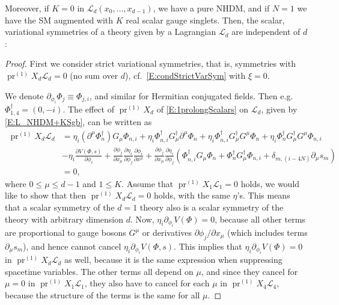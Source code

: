 \documentclass[a4paper,hidelinks, 12pt]{article}
\numberwithin{equation}{section}
\theoremstyle{plain}
\newcommand{\N}[1]{\mathbb{#1}}
\newcommand{\nn}{\nonumber}
\newcommand{\mc}{\mathcal}
\newcommand{\on}{\operatorname}
\begin{document}
Moreover, if $K=0$ in $\mc{L}_d(x_0,\ldots,x_{d-1})$, we have a pure NHDM, and if $N=1$ we have the SM augmented with $K$ real scalar gauge singlets.
Then, the scalar, variational symmetries of a theory given by a Lagrangian $\mc{L}_d$ are independent of $d$: 
\MainProp*
\begin{proof} 
First we consider strict variational symmetries, that is, symmetries with
$\on{pr}^{(1)}X_d\mc{L}_d=0$ (no sum over $d$), cf.~\eqref{E:condStrictVarSym} with $\xi=0$. 

 We denote %
$\partial_{\phi_i} \Phi_j\equiv  \Phi_{j,i}$, and similar for Hermitian conjugated fields. Then
e.g.~$\Phi_{1,4}^\dag =(0,-i)$. The effect of $\on{pr}^{(1)}X_d$ of \eqref{E:1prolongScalars} on $\mc{L}_d$, given by \eqref{E:L_NHDM+KSgb}, can be written as
\begin{align}\label{E:pr1vL1d4d}
	\on{pr}^{(1)}X_{d}\mc{L}_{d} &= 
	\eta_i (\partial^\mu \Phi_n^\dag) G_\mu \Phi_{n,i}+\eta_i \Phi_{n,i}^\dag G_\mu^\dag \partial^\mu \Phi_n+ \eta_i\Phi_{n,i}^\dag G_\mu^\dag G^\mu \Phi_n + \eta_i\Phi_{n}^\dag G_\mu^\dag G^\mu \Phi_{n,i}\nn \\
	&-\eta_i \frac{\partial V(\Phi,s)}{\partial \phi_i}
	+\frac{\partial \phi_j}{\partial{x_\mu}}\frac{\partial \eta_i}{\partial\phi_j}\frac{\partial \phi_i}{\partial x^\mu}
	+\frac{\partial \phi_j}{\partial{x_\mu}}\frac{\partial \eta_i}{\partial\phi_j}(\Phi_{n,i}^\dag G_\mu \Phi_n+\Phi_n^\dag G_\mu^\dag \Phi_{n,i}+\delta_{m,(i-4N)}\partial_\mu s_{m}) \nn \\
	&=0,
\end{align}
where $0\leq \mu \leq d-1$ and $1\leq K$. Assume that $\on{pr}^{(1)}X_1\mc{L}_1=0$ holds, we would like to show that then $\on{pr}^{(1)}X_d\mc{L}_d=0$ holds, with the same $\eta$'s. This means that a scalar symmetry of the $d=1$ theory also is a scalar symmetry of the theory with arbitrary dimension $d$. Now, $\eta_i {\partial_{\phi_i} V(\Phi)}{}=0$,
because all other terms are proportional to gauge bosons $G^\mu$ or
derivatives $\partial \phi_j /\partial x_\mu$ (which includes terms $\partial_\mu s_m$), and hence cannot cancel 
$\eta_i {\partial_{\phi_i} V(\Phi,s)}{}$. This implies that
$\eta_i {\partial_{\phi_i} V(\Phi)}{}=0$ in $\on{pr}^{(1)}X_d\mc{L}_d$ as well, because it is the same expression when suppressing spacetime variables.
The other terms all depend on $\mu$, and since they cancel for $\mu=0$ in $\on{pr}^{(1)}X_1\mc{L}_1$, they also have to cancel for each $\mu$ in
$\on{pr}^{(1)}X_4\mc{L}_4$, because the structure of the terms is the same for all $\mu$.


\end{proof}
\end{document}
